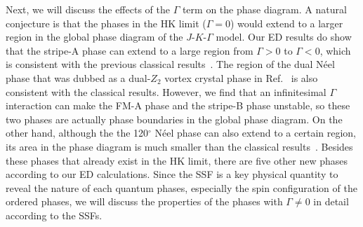 \documentclass[aps,prb,reprint,amsfonts,amsmath,amssymb,showpacs,groupedaddress,superscriptaddress]{revtex4-1}
\begin{document}



Next, we will discuss the effects of the $\Gamma$ term on the phase diagram. A natural conjecture is that the phases in the HK limit ($\Gamma=0$) would extend to a larger region in the global phase diagram of the $J$-$K$-$\Gamma$ model. Our ED results do show that the stripe-A phase can extend to a large region from $\Gamma>0$ to $\Gamma<0$, which is consistent with the previous classical results~\cite{PhysRevB.92.165108}. The region of the dual N\'{e}el phase that was dubbed as a dual-$Z_{2}$ vortex crystal phase in Ref.~ is also consistent with the classical results. However, we find that an infinitesimal $\Gamma$ interaction can make the FM-A phase and the stripe-B phase unstable, so these two phases are actually phase boundaries in the global phase diagram. On the other hand, although the the 120$^\circ$ N\'{e}el phase can also extend to a certain region, its area in the phase diagram is much smaller than the classical results~\cite{PhysRevB.92.165108}. Besides these phases that already exist in the HK limit, there are five other new phases according to our ED calculations. Since the SSF is a key physical quantity to reveal the nature of each quantum phases, especially the spin configuration of the ordered phases, we will discuss the properties of the phases with $\Gamma\neq0$ in detail according to the SSFs.
\end{document}
